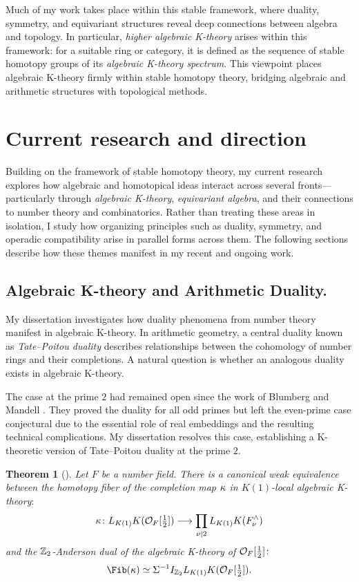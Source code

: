 \documentclass[11pt]{article}
\newtheorem{theorem}{Theorem}
\begin{document}
Much of my work takes place within this stable framework, where duality, symmetry, and equivariant structures reveal deep connections between algebra and topology.
In particular, \emph{higher algebraic K-theory} arises within this framework: for a suitable ring or category, it is defined as the sequence of stable homotopy groups of its \emph{algebraic K-theory spectrum}.
This viewpoint places algebraic K-theory firmly within stable homotopy theory, bridging algebraic and arithmetic structures with topological methods.


\section{Current research and direction}
Building on the framework of stable homotopy theory, my current research explores how algebraic and homotopical ideas interact across several fronts—particularly through {\it algebraic K-theory}, {\it equivariant algebra}, and their connections to number theory and combinatorics.
Rather than treating these areas in isolation, I study how organizing principles such as duality, symmetry, and operadic compatibility arise in parallel forms across them.
The following sections describe how these themes manifest in my recent and ongoing work.


\subsection{Algebraic K-theory and Arithmetic Duality.}
My dissertation investigates how duality phenomena from number theory manifest in algebraic K-theory.
In arithmetic geometry, a central duality known as {\it Tate–Poitou duality} describes relationships between the cohomology of number rings and their completions. 
A natural question is whether an analogous duality exists in algebraic K-theory.

The case at the prime $2$ had remained open since the work of Blumberg and Mandell \cite{MR4121155}. 
They proved the duality for all odd primes but left the even-prime case conjectural due to the essential role of real embeddings and the resulting technical complications.
My dissertation resolves this case, establishing a K-theoretic version of Tate–Poitou duality at the prime $2$.

\begin{theorem}[\cite{Cho}]
Let $F$ be a number field.
There is a canonical weak equivalence between  the {\it homotopy fiber of the completion map} $\kappa$ in $K(1)$-local algebraic K-theory$\colon$
\[\kappa\colon L_{K(1)}K({\mathcal{O}}_F[\tfrac{1}{2}]) \longrightarrow \prod_{\nu \mid 2} L_{K(1)}K(F_\nu^\wedge)\]
and the $\mathbb{Z}_2$-Anderson dual of the algebraic K-theory of ${\mathcal{O}}_F[\tfrac{1}{2}]\colon$
 \begin{equation}\label{fib}
 \Fib(\ka) \simeq \SI^{-1} I_{\bZ_2} L_{K(1)}K(\calO_F[\tfrac{1}{2}]).
\end{equation}
\end{theorem}
\end{document}

